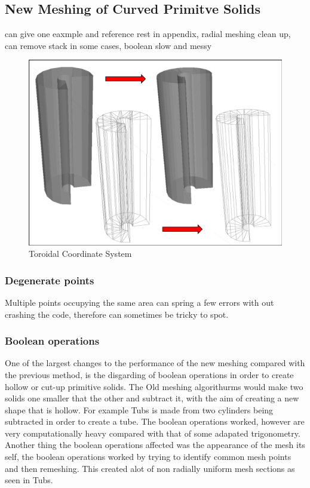 \documentclass[12pt,a4paper]{article}
\begin{document}
\subsection{New Meshing of Curved Primitve Solids}
can give one eaxmple and reference rest in appendix, radial meshing clean up, can remove stack in some cases, boolean slow and messy
\begin{figure}[h!]
\centering
\includegraphics[scale=0.5]{Images//Meshes//tubs.png}
\caption[width=\columnwidth]{Toroidal Coordinate System}
\label{conts}
\end{figure}



\subsubsection{Degenerate points}
Multiple points occupying the same area can spring a few errors with out crashing the code, therefore can sometimes be tricky to spot. 

\subsubsection{Boolean operations}
\label{bool}
One of the largest changes to the performance of the new meshing compared with the previous method, is the disgarding of boolean operations in order to create hollow or cut-up primitive solids. The Old meshing algorithurms would make two solids one smaller that the other and subtract it, with the aim of creating a new shape that is hollow. For example Tubs is made from two cylinders being subtracted in order to create a tube. The boolean operations worked, however are very computationally heavy compared with that of some adapated trigonometry. Another thing the boolean operations affected was the appearance of the mesh its self, the boolean operations worked by trying to identify common mesh points and then remeshing. This created alot of non radially uniform mesh sections as seen in Tubs.
\end{document}
